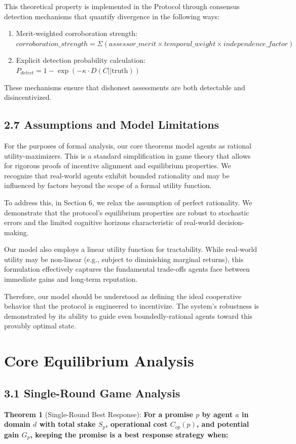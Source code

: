\documentclass[11pt]{article}
\begin{document}
This theoretical property is implemented in the Protocol through consensus detection mechanisms that quantify divergence in the following ways:

\begin{enumerate}
\item Merit-weighted corroboration strength:
\(corroboration\_strength = \Sigma (assessor\_merit \times temporal\_weight \times independence\_factor)\)

\item Explicit detection probability calculation:
\(P_{detect} = 1 - \exp(-\kappa \cdot D(C||\text{truth}))\)
\end{enumerate}

These mechanisms ensure that dishonest assessments are both detectable and disincentivized.
\subsection{2.7 Assumptions and Model Limitations}
\label{sec:orgf2fffd1}
For the purposes of formal analysis, our core theorems model agents as rational utility-maximizers. This is a standard simplification in game theory that allows for rigorous proofs of incentive alignment and equilibrium properties. We recognize that real-world agents exhibit bounded rationality and may be influenced by factors beyond the scope of a formal utility function.

To address this, in Section 6, we relax the assumption of perfect rationality. We demonstrate that the protocol's equilibrium properties are robust to stochastic errors and the limited cognitive horizons characteristic of real-world decision-making.

Our model also employs a linear utility function for tractability. While real-world utility may be non-linear (e.g., subject to diminishing marginal returns), this formulation effectively captures the fundamental trade-offs agents face between immediate gains and long-term reputation.

Therefore, our model should be understood as defining the ideal cooperative behavior that the protocol is engineered to incentivize. The system's robustness is demonstrated by its ability to guide even boundedly-rational agents toward this provably optimal state.
\section{Core Equilibrium Analysis}
\label{sec:org827c414}
\subsection{3.1 Single-Round Game Analysis}
\label{sec:org02a6dab}
\textbf{Theorem 1} (Single-Round Best Response): \textbf{For a promise \(p\) by agent \(a\) in domain \(d\) with total stake \(S_p\), operational cost \(C_{op}(p)\), and potential gain \(G_p\), keeping the promise is a best response strategy when:}
\end{document}
